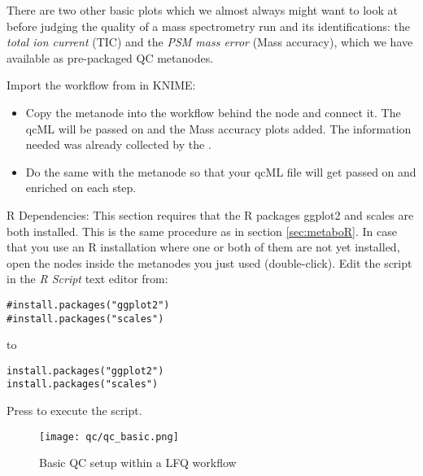 There are two other basic plots which we almost always might want to look at before judging the quality of a mass spectrometry run and its identifications: the \textit{total ion current} (TIC) and the \textit{PSM mass error} (Mass accuracy), which we have available as pre-packaged QC metanodes.
\begin{task}
Import the workflow from  in KNIME: 
\end{task}
\begin{itemize}
\item Copy the  metanode into the workflow behind the  node and connect it. The qcML will be passed on and the Mass accuracy plots added. The information needed was already collected by the .
\item Do the same with the  metanode so that your qcML file will get passed on and enriched on each step. 
\end{itemize}

R Dependencies: This section requires that the R packages ggplot2 and scales are both installed. This is the same procedure as in section \ref{sec:metaboR}. In case that you use an R installation where one or both of them are not yet installed, open the  nodes inside the metanodes you just used (double-click). Edit the script in the \textit{R Script} text editor from:\\

\begin{code}
\begin{verbatim}
#install.packages("ggplot2")
#install.packages("scales")
\end{verbatim}
\end{code}
to 
\begin{code}
\begin{verbatim}
install.packages("ggplot2")
install.packages("scales")
\end{verbatim}
\end{code}
Press  to execute the script.\newline

\vspace{1cm}

\begin{figure}[htbp]
  \centering
  \texttt{[image: qc/qc\_basic.png]}
  \caption{Basic QC setup within a LFQ workflow}
  \label{fig:qc_basic}
\end{figure}

